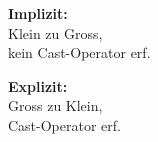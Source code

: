 \begin{minipage}{0.4\columnwidth}
    \textbf{Implizit:}\\
    Klein zu Gross,\\
    kein Cast-Operator erf.\\
    
\end{minipage}
\begin{minipage}{0.55\columnwidth}
    \textbf{Explizit:}\\
    Gross zu Klein,\\
    Cast-Operator erf.\\
    
\end{minipage}

